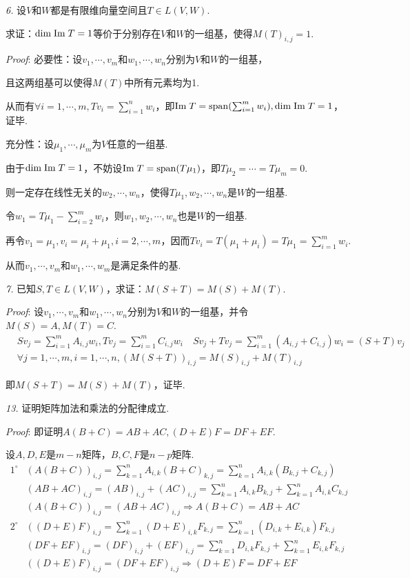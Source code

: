 \textit{6.}
设$V$和$W$都是有限维向量空间且$T \in L(V,W)$.

求证：$\mathrm{dim \;} \mathrm{Im \;} T=1$等价于分别存在$V$和$W$的一组基，使得$M(T)_{i,j}=1$.

\textit{Proof}:
必要性：设$v_1,\cdots,v_m$和$w_1,\cdots,w_n$分别为$V$和$W$的一组基，

且这两组基可以使得$M(T)$中所有元素均为1.

从而有$\forall i=1,\cdots,m,Tv_i=\sum_{i=1}^n w_i$，即$\mathrm{Im \;} T=\mathrm{span} (\sum_{i=1}^m w_i),\mathrm{dim \;} \mathrm{Im \;} T=1$，证毕.

充分性：设$\mu_1,\cdots,\mu_m$为$V$任意的一组基.

由于$\mathrm{dim \;} \mathrm{Im \;} T=1$，不妨设$\mathrm{Im \;} T=\mathrm{span} (T \mu_1)$，即$T \mu_2=\cdots=T \mu_m=0$.

则一定存在线性无关的$w_2,\cdots,w_n$，使得$T \mu_1,w_2,\cdots,w_n$是$W$的一组基.

令$w_1=T \mu_1-\sum_{i=2}^m w_i$，则$w_1,w_2,\cdots,w_n$也是$W$的一组基.

再令$v_1=\mu_1,v_i=\mu_i+\mu_1,i=2,\cdots,m$，因而$Tv_i=T(\mu_1+\mu_i)=T \mu_1=\sum_{i=1}^m w_i$.

从而$v_1,\cdots,v_m$和$w_1,\cdots,w_m$是满足条件的基.

\hspace*{\fill}

\textit{7.}
已知$S,T \in L(V,W)$，求证：$M(S+T)=M(S)+M(T)$.

\textit{Proof}:
设$v_1,\cdots,v_m$和$w_1,\cdots,w_n$分别为$V$和$W$的一组基，并令$M(S)=A,M(T)=C$.
    \begin{align*}
        &Sv_j=\sum_{i=1}^m A_{i,j}w_i,Tv_j=\sum_{i=1}^m C_{i,j}w_i \quad
        Sv_j+Tv_j=\sum_{i=1}^m (A_{i,j}+C_{i,j})w_i=(S+T)v_j \\
        &\forall j=1,\cdots,m,i=1,\cdots,n,(M(S+T))_{i,j}=M(S)_{i,j}+M(T)_{i,j}
    \end{align*}

即$M(S+T)=M(S)+M(T)$，证毕.

\newpage

\textit{13.}
证明矩阵加法和乘法的分配律成立.

\textit{Proof}:
即证明$A(B+C)=AB+AC,(D+E)F=DF+EF$.

设$A,D,E$是$m-n$矩阵，$B,C,F$是$n-p$矩阵.
    \begin{align*}
        1^{\circ} &(A(B+C))_{i,j}=\sum_{k=1}^n A_{i,k}(B+C)_{k,j}=\sum_{k=1}^n A_{i,k}(B_{k,j}+C_{k,j}) \\
        &(AB+AC)_{i,j}=(AB)_{i,j}+(AC)_{i,j}=\sum_{k=1}^n A_{i,k}B_{k,j}+\sum_{k=1}^n A_{i,k}C_{k,j} \\
        &(A(B+C))_{i,j}=(AB+AC)_{i,j} \Rightarrow A(B+C)=AB+AC \\
        2^{\circ} &((D+E)F)_{i,j}=\sum_{k=1}^n (D+E)_{i,k}F_{k,j}=\sum_{k=1}^n (D_{i,k}+E_{i,k})F_{k,j} \\
        &(DF+EF)_{i,j}=(DF)_{i,j}+(EF)_{i,j}=\sum_{k=1}^n D_{i,k}F_{k,j}+\sum_{k=1}^n E_{i,k}F_{k,j} \\
        &((D+E)F)_{i,j}=(DF+EF)_{i,j} \Rightarrow (D+E)F=DF+EF
    \end{align*}


